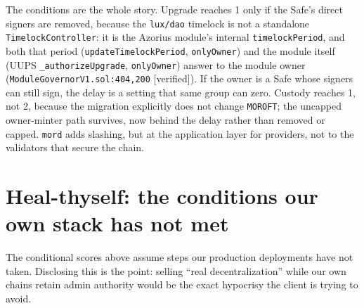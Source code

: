 \documentclass[11pt,a4paper]{article}
\newcommand{\code}[1]{\texttt{\small #1}}
\newcommand{\pv}[1]{{\color{muted}\sffamily\scriptsize[#1]}}
\begin{document}
The conditions are the whole story. Upgrade reaches 1 only if the Safe's direct
signers are removed, because the \code{lux/dao} timelock is not a standalone
\code{TimelockController}: it is the Azorius module's internal \code{timelockPeriod},
and both that period (\code{updateTimelockPeriod}, \code{onlyOwner}) and the module
itself (UUPS \code{\_authorizeUpgrade}, \code{onlyOwner}) answer to the module
owner (\code{ModuleGovernorV1.sol:404,200} \pv{verified}). If the owner is a Safe
whose signers can still sign, the delay is a setting that same group can zero.
Custody reaches 1, not 2, because the migration explicitly does not change
\code{MOROFT}; the uncapped owner-minter path survives, now behind the delay
rather than removed or capped. \code{mord} adds slashing, but at the application
layer for providers, not to the validators that secure the chain.

\section{Heal-thyself: the conditions our own stack has not met}

The conditional scores above assume steps our production deployments have not
taken. Disclosing this is the point: selling ``real decentralization'' while our
own chains retain admin authority would be the exact hypocrisy the client is
trying to avoid.
\end{document}
